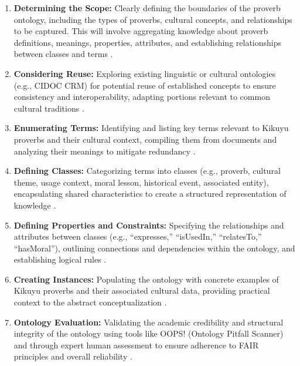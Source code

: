 \documentclass[12pt]{article}
\let\cite\textcite  %
\begin{document}
\begin{enumerate}
\item \textbf{Determining the Scope:} Clearly defining the boundaries of the proverb ontology, including the types of proverbs, cultural concepts, and relationships to be captured. This will involve aggregating knowledge about proverb definitions, meanings, properties, attributes, and establishing relationships between classes and terms \cite{w3c2023owl}.

\item \textbf{Considering Reuse:} Exploring existing linguistic or cultural ontologies (e.g., CIDOC CRM) for potential reuse of established concepts to ensure consistency and interoperability, adapting portions relevant to common cultural traditions \cite{w3c2023owl}.

\item \textbf{Enumerating Terms:} Identifying and listing key terms relevant to Kikuyu proverbs and their cultural context, compiling them from documents and analyzing their meanings to mitigate redundancy \cite{w3c2023owl}.

\item \textbf{Defining Classes:} Categorizing terms into classes (e.g., proverb, cultural theme, usage context, moral lesson, historical event, associated entity), encapsulating shared characteristics to create a structured representation of knowledge \cite{w3c2023owl}.

\item \textbf{Defining Properties and Constraints:} Specifying the relationships and attributes between classes (e.g., ``expresses,'' ``isUsedIn,'' ``relatesTo,'' ``hasMoral''), outlining connections and dependencies within the ontology, and establishing logical rules \cite{w3c2023owl}.

\item \textbf{Creating Instances:} Populating the ontology with concrete examples of Kikuyu proverbs and their associated cultural data, providing practical context to the abstract conceptualization \cite{w3c2023owl}.

\item \textbf{Ontology Evaluation:} Validating the academic credibility and structural integrity of the ontology using tools like OOPS! (Ontology Pitfall Scanner) and through expert human assessment to ensure adherence to FAIR principles and overall reliability \cite{w3c2023owl}.
\end{enumerate}
\end{document}
